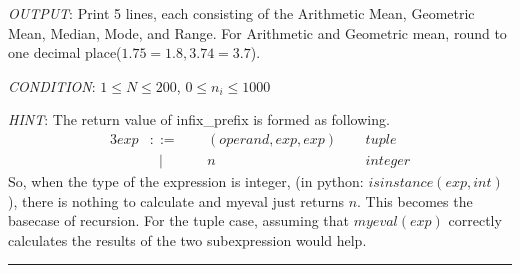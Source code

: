 \documentclass{article}
\begin{document}
\textit{OUTPUT}: Print 5 lines, each consisting of the Arithmetic Mean, Geometric
Mean, Median, Mode, and Range. For Arithmetic and Geometric mean, round to one
decimal place($1.75 = 1.8, 3.74 = 3.7$).

\textit{CONDITION}: $ 1 \le N \le 200$, $ 0 \le n_{i} \le 1000$

\textit{HINT}: The return value of infix\_prefix is formed as following.
\begin{alignat*}{3}
  exp &::= \ \  &&(operand, exp, exp)\ \  &&tuple\\
      &\ \ \ | &&n &&integer
\end{alignat*}
So, when the type of the expression is integer, (in python: $isinstance(exp, int)$), there
is nothing to calculate and myeval just returns $n$. This becomes the basecase
of recursion. For the tuple case, assuming that $myeval(exp)$ correctly
calculates the results of the two subexpression would help.\\
\noindent\rule{\textwidth}{0.5pt}
\end{document}
